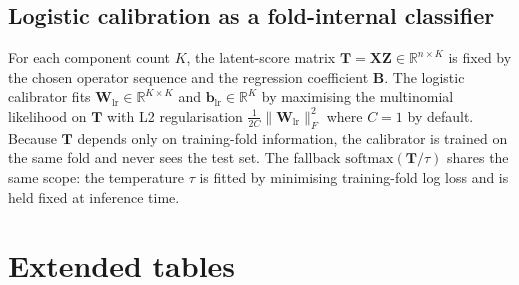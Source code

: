 \documentclass[a4paper,11pt]{article}
\newcommand{\R}{\mathbb{R}}
\newcommand{\softmax}{\mathrm{softmax}}
\newcommand{\Xmat}{\mathbf{X}}
\newcommand{\Tmat}{\mathbf{T}}
\newcommand{\Wmat}{\mathbf{W}}
\newcommand{\Bmat}{\mathbf{B}}
\newcommand{\Zmat}{\mathbf{Z}}
\newcommand{\bvec}{\mathbf{b}}
\begin{document}
\subsection{Logistic calibration as a fold-internal classifier}\label{app:calibration}
For each component count $K$, the latent-score matrix
$\Tmat=\Xmat\Zmat\in\R^{n\times K}$ is fixed by the chosen operator
sequence and the regression coefficient $\Bmat$. The logistic
calibrator fits $\Wmat_{\mathrm{lr}}\in\R^{K\times K}$ and
$\bvec_{\mathrm{lr}}\in\R^K$ by maximising the multinomial likelihood
on $\Tmat$ with L2 regularisation
$\frac{1}{2C}\|\Wmat_{\mathrm{lr}}\|_F^2$ where $C=1$ by default. Because
$\Tmat$ depends only on training-fold information, the calibrator is
trained on the same fold and never sees the test set. The fallback
$\softmax(\Tmat/\tau)$ shares the same scope: the temperature $\tau$
is fitted by minimising training-fold log loss and is held fixed at
inference time.

\section{Extended tables}\label{app:tables}
\end{document}
